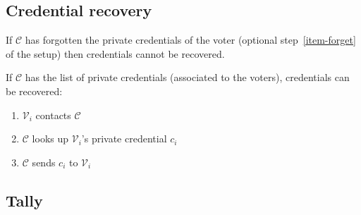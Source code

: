 \documentclass[a4paper]{article}
\begin{document}
\subsection{Credential recovery}\label{sec:recovery}

If $\mathcal C$ has forgotten the private credentials of the voter
(optional step~\ref{item-forget} of the setup) then credentials cannot
be recovered.

If $\mathcal C$ has the list of private credentials (associated to the
voters), credentials can be recovered:
\begin{enumerate}
\item $\mathcal{V}_i$ contacts $\mathcal{C}$
\item $\mathcal{C}$ looks up $\mathcal{V}_i$'s private credential $c_i$
\item $\mathcal{C}$ sends $c_i$ to $\mathcal{V}_i$
\end{enumerate}

\subsection{Tally}
\end{document}
